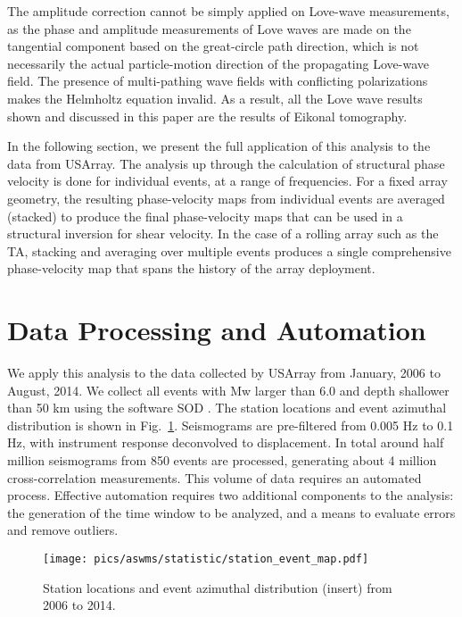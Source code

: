 The amplitude correction cannot be simply applied on Love-wave measurements, as the phase and amplitude measurements of Love waves are made on the tangential component based on the great-circle path direction, which is not necessarily the actual particle-motion direction of the propagating Love-wave field. The presence of multi-pathing wave fields with conflicting polarizations makes the Helmholtz equation invalid. As a result, all the Love wave results shown and discussed in this paper are the results of Eikonal tomography.

In the following section, we present the full application of this analysis to the data from USArray. The analysis up through the calculation of structural phase velocity is done for individual events, at a range of frequencies.  For a fixed array geometry, the resulting phase-velocity maps from individual events are averaged (stacked) to produce the final phase-velocity maps that can be used in a structural inversion for shear velocity. In the case of a rolling array such as the TA, stacking and averaging over multiple events produces a single comprehensive phase-velocity map that spans the history of the array deployment.   


\section{Data Processing and Automation}
\label{sec:data_processing}
We apply this analysis to the data collected by USArray from January, 2006 to August, 2014. We collect all events with Mw larger than 6.0 and depth shallower than 50 km using the software SOD \citep{Owens:2004ca}. The station locations and event azimuthal distribution is shown in Fig.~\ref{fig:stationmap}. Seismograms are pre-filtered from 0.005 Hz to 0.1 Hz, with instrument response deconvolved to displacement. In total around half million seismograms from 850 events are processed, generating about 4 million cross-correlation measurements. This volume of data requires an automated process. Effective automation requires two additional components to the analysis: the generation of the time window to be analyzed, and a means to evaluate errors and remove outliers.

\begin{figure}
	\center
	\texttt{[image: pics/aswms/statistic/station\_event\_map.pdf]}
	\caption{Station locations and event azimuthal distribution (insert) from 2006 to 2014.}
	\label{fig:stationmap}
\end{figure}

